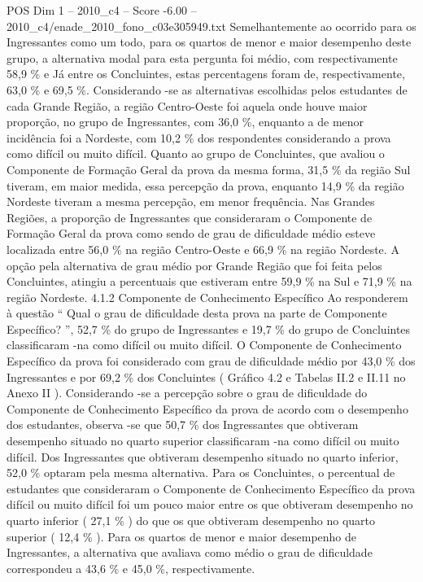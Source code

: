 \begin{textsample}{POS Dim 1 – 2010\_c4 – Score -6.00 – 2010\_c4/enade\_2010\_fono\_c03e305949.txt}
Semelhantemente ao ocorrido para os Ingressantes como um todo, para os quartos de menor e maior desempenho deste grupo, a alternativa modal para esta pergunta foi médio, com respectivamente 58,9 \% e Já entre os Concluintes, estas percentagens foram de, respectivamente, 63,0 \% e 69,5 \%.
Considerando -se as alternativas escolhidas pelos estudantes de cada Grande Região, a região Centro-Oeste foi aquela onde houve maior proporção, no grupo de Ingressantes, com 36,0 \%, enquanto a de menor incidência foi a Nordeste, com 10,2 \% dos respondentes considerando a prova como difícil ou muito difícil.
Quanto ao grupo de Concluintes, que avaliou o Componente de Formação Geral da prova da mesma forma, 31,5 \% da região Sul tiveram, em maior medida, essa percepção da prova, enquanto 14,9 \% da região Nordeste tiveram a mesma percepção, em menor frequência.
Nas Grandes Regiões, a proporção de Ingressantes que consideraram o Componente de Formação Geral da prova como sendo de grau de dificuldade médio esteve localizada entre 56,0 \% na região Centro-Oeste e 66,9 \% na região Nordeste.
A opção pela alternativa de grau médio por Grande Região que foi feita pelos Concluintes, atingiu a percentuais que estiveram entre 59,9 \% na Sul e 71,9 \% na região Nordeste. 4.1.2 Componente de Conhecimento Específico Ao responderem à questão “ Qual o grau de dificuldade desta prova na parte de Componente Específico? ”, 52,7 \% do grupo de Ingressantes e 19,7 \% do grupo de Concluintes classificaram -na como difícil ou muito difícil.
O Componente de Conhecimento Específico da prova foi considerado com grau de dificuldade médio por 43,0 \% dos Ingressantes e por 69,2 \% dos Concluintes ( Gráfico 4.2 e Tabelas II.2 e II.11 no Anexo II ).
Considerando -se a percepção sobre o grau de dificuldade do Componente de Conhecimento Específico da prova de acordo com o desempenho dos estudantes, observa -se que 50,7 \% dos Ingressantes que obtiveram desempenho situado no quarto superior classificaram -na como difícil ou muito difícil.
Dos Ingressantes que obtiveram desempenho situado no quarto inferior, 52,0 \% optaram pela mesma alternativa.
Para os Concluintes, o percentual de estudantes que consideraram o Componente de Conhecimento Específico da prova difícil ou muito difícil foi um pouco maior entre os que obtiveram desempenho no quarto inferior ( 27,1 \% ) do que os que obtiveram desempenho no quarto superior ( 12,4 \% ).
Para os quartos de menor e maior desempenho de Ingressantes, a alternativa que avaliava como médio o grau de dificuldade correspondeu a 43,6 \% e 45,0 \%, respectivamente.

\end{textsample}
